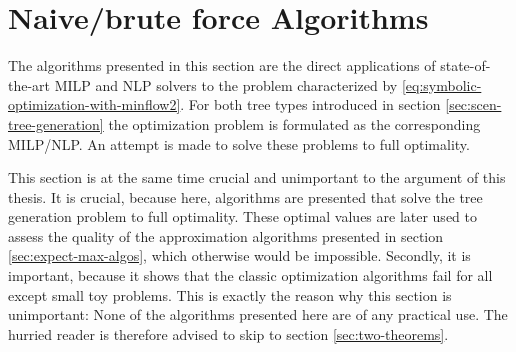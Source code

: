 \section{Naive/brute force Algorithms}
\label{sec:naive}
The algorithms presented in this section are the direct applications of state-of-the-art MILP and NLP solvers to the problem characterized by \eqref{eq:symbolic-optimization-with-minflow2}. For both tree types introduced in section \ref{sec:scen-tree-generation} the optimization problem is formulated as the corresponding MILP/NLP. An attempt is made to solve these problems to full optimality.

This section is at the same time crucial and unimportant to the argument of this thesis.
It is crucial, because here, algorithms are presented that solve the tree generation problem to full optimality.
These optimal values are later used to assess the quality of the approximation algorithms presented in section \ref{sec:expect-max-algos}, which otherwise would be impossible.
Secondly, it is important, because it shows that the classic optimization algorithms fail for all except small toy problems.
This is exactly the reason why this section is unimportant: None of the algorithms presented here are of any practical use.
The hurried reader is therefore advised to skip to section \ref{sec:two-theorems}.


